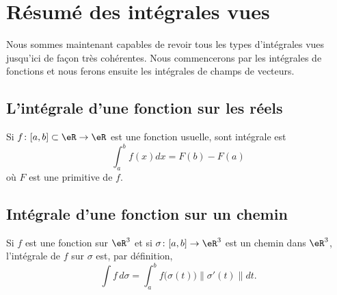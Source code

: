\section{Résumé des intégrales vues}

Nous sommes maintenant capables de revoir tous les types d'intégrales vues jusqu'ici de façon très cohérentes. Nous commencerons par les intégrales de fonctions et nous ferons ensuite les intégrales de champs de vecteurs.

\subsection{L'intégrale d'une fonction sur les réels}

Si \( f\colon \mathopen[ a , b \mathclose]\subset\eR\to \eR\) est une fonction usuelle, sont intégrale est
\begin{equation}
	\int_a^bf(x)dx=F(b)-F(a)
\end{equation}
où \( F\) est une primitive de \( f\).

\subsection{Intégrale d'une fonction sur un chemin}

Si \( f\) est une fonction sur \( \eR^3\) et si \( \sigma\colon \mathopen[ a , b \mathclose]\to \eR^3\) est un chemin dans \( \eR^3\), l'intégrale de \( f\) sur \( \sigma\) est, par définition,
\begin{equation}
	\int f\,d\sigma=\int_a^b f\big( \sigma(t) \big)\| \sigma'(t) \|dt.
\end{equation}

